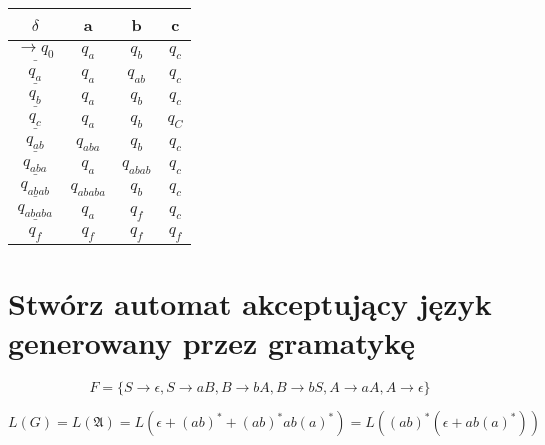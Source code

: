 \documentclass{../notatki}
\begin{document}
\begin{table}[h!]
  \centering
  \begin{tabular}{c|c|c|c}
    $\delta$                       & a           & b            & c \\ \hline
    $\underline{\rightarrow q_0}$  & $q_a$       & $q_b$        &
    $q_c$ \\ \hline
    $\underline{q_a}$              & $q_a$       & $q_{ab}$     &
    $q_c$ \\ \hline
    $\underline{q_b}$              & $q_a$       & $q_b$        &
    $q_c$ \\ \hline
    $\underline{q_c}$              & $q_a$       & $q_b$        &
    $q_C$ \\ \hline
    $\underline{q_{ab}}$           & $q_{aba}$   & $q_b$        &
    $q_c$ \\ \hline
    $\underline{q_{aba}}$          & $q_a$       & $q_{abab}$   &
    $q_c$ \\ \hline
    $\underline{q_{abab}}$         & $q_{ababa}$ & $q_b$        &
    $q_c$ \\ \hline
    $\underline{q_{ababa}}$        & $q_a$       & $q_f$        &
    $q_c$ \\ \hline
    $q_f$                          & $q_f$       & $q_f$        &
    $q_f$ \\ \hline
  \end{tabular}
\end{table}

\section{Stwórz automat akceptujący język generowany przez gramatykę}

$$
F = \{S \rightarrow \epsilon, S \rightarrow aB, B \rightarrow bA, B
\rightarrow bS, A \rightarrow aA, A \rightarrow \epsilon\}
$$

\divider

\begin{figure*}[h]
  \centering
\end{figure*}

$$
L(G) = L(\mathfrak{A}) = L(\epsilon + (ab)^* + (ab)^*ab(a)^*) =
L((ab)^*(\epsilon + ab(a)^*))
$$
\end{document}
